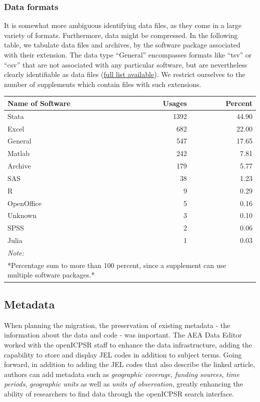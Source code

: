 \documentclass[]{article}
\begin{document}
\hypertarget{data-formats}{%
\subsubsection{Data formats}\label{data-formats}}

It is somewhat more ambiguous identifying data files, as they come in a
large variety of formats. Furthermore, data might be compressed. In the
following table, we tabulate data files and archives, by the software
package associated with their extension. The data type ``General''
encompasses formats like ``tsv'' or ``csv'' that are not associated with
any particular software, but are nevertheless clearly identifiable as
data files (\href{../data/original/aea_file_ext.csv}{full list
available}). We restrict ourselves to the number of supplements which
contain files with such extensions.

\begin{table}[H]
\centering
\begin{tabular}{l|r|r}
\hline
Name of Software & Usages & Percent\\
\hline
Stata & 1392 & 44.90\\
\hline
Excel & 682 & 22.00\\
\hline
General & 547 & 17.65\\
\hline
Matlab & 242 & 7.81\\
\hline
Archive & 179 & 5.77\\
\hline
SAS & 38 & 1.23\\
\hline
R & 9 & 0.29\\
\hline
OpenOffice & 5 & 0.16\\
\hline
Unknown & 3 & 0.10\\
\hline
SPSS & 2 & 0.06\\
\hline
Julia & 1 & 0.03\\
\hline
\multicolumn{3}{l}{\textit{Note: }}\\
\multicolumn{3}{l}{*Percentage sum to more than 100 percent, since a supplement can use multiple software packages.*}\\
\end{tabular}
\end{table}

\hypertarget{metadata}{%
\subsection{Metadata}\label{metadata}}

When planning the migration, the preservation of existing metadata - the
information about the data and code - was important. The AEA Data Editor
worked with the openICPSR staff to enhance the data infrastructure,
adding the capability to store and display JEL codes in addition to
subject terms. Going forward, in addition to adding the JEL codes that
also describe the linked article, authors can add metadata such as
\emph{geographic coverage}, \emph{funding sources}, \emph{time periods},
\emph{geographic units} as well as \emph{units of observation}, greatly
enhancing the ability of researchers to find data through the openICPSR
search interface.
\end{document}
